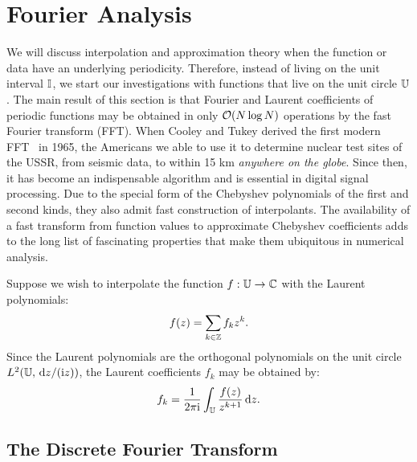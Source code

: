 \chapter{Fourier Analysis}\label{chapter:FourierAnalysis}

We will discuss interpolation and approximation theory when the function or data have an underlying periodicity. Therefore, instead of living on the unit interval $\mathbb{I}$, we start our investigations with functions that live on the unit circle $\mathbb{U}$. The main result of this section is that Fourier and Laurent coefficients of periodic functions may be obtained in only $\mathcal{O}(N\log N)$ operations by the fast Fourier transform (FFT). When Cooley and Tukey derived the first modern FFT~\cite{Cooley-Tukey-19-297-65} in 1965, the Americans we able to use it to determine nuclear test sites of the USSR, from seismic data, to within 15 km {\em anywhere on the globe}. Since then, it has become an indispensable algorithm and is essential in digital signal processing. Due to the special form of the Chebyshev polynomials of the first and second kinds, they also admit fast construction of interpolants. The availability of a fast transform from function values to approximate Chebyshev coefficients adds to the long list of fascinating properties that make them ubiquitous in numerical analysis.

Suppose we wish to interpolate the function $f:\mathbb{U}\to\mathbb{C}$ with the Laurent polynomials:
\begin{equation}
f(z) = \sum_{k\in\mathbb{Z}} f_k z^k.
\end{equation}
Since the Laurent polynomials are the orthogonal polynomials on the unit circle $L^2(\mathbb{U},{\rm\,d} z/({\rm i} z))$, the Laurent coefficients $f_k$ may be obtained by:
\begin{equation}
f_k = \dfrac{1}{2\pi{\rm i}}\int_{\mathbb{U}} \dfrac{f(z)}{z^{k+1}}{\rm\,d} z.
\end{equation}

\section{The Discrete Fourier Transform}

